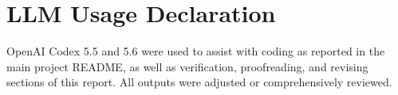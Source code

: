 \ifpdf
    \graphicspath{{Sections/7_appendix_llms_figs/Raster/}{Sections/7_appendix_llms_figs/PDF/}{Sections/7_appendix_llms_figs/}}
\else
    \graphicspath{{Sections/7_appendix_llms_figs/Vector/}{Sections/7_appendix_llms_figs/}}
\fi

\chapter{LLM Usage Declaration} 

OpenAI Codex 5.5 and 5.6 were used to assist with coding as reported in the main project README, as well as verification, proofreading, and revising sections of this report. All outputs were adjusted or comprehensively reviewed.
